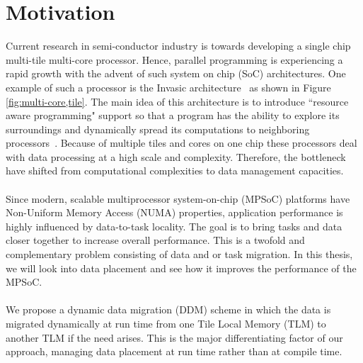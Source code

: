 \documentclass{listhesis}
\begin{document}
\section{Motivation}
Current research in semi-conductor industry is towards developing a single chip multi-tile multi-core processor. Hence, parallel programming is experiencing a rapid growth with the advent of such system on chip (SoC) architectures. One example of such a processor is the Invasic architecture~\cite{invasive} as shown in Figure \ref{fig:multi-core,tile}. The main idea of this architecture is to introduce ``resource aware programming" support so that a program has the ability to explore its surroundings and dynamically spread its computations to neighboring processors~\cite{invasive}. Because of multiple tiles and cores on one chip these processors deal with data processing at a high scale and complexity. Therefore, the bottleneck have shifted from computational complexities to data management capacities.\\
\\
Since modern, scalable multiprocessor system-on-chip (MPSoC) platforms have Non-Uniform Memory Access (NUMA) properties, application performance is highly influenced by data-to-task locality. The goal is to bring tasks and data closer together to increase overall performance. This is a twofold and complementary problem consisting of data and or task migration. In this thesis, we will look into data placement and see how it improves the performance of the MPSoC.\\
\\
We propose a dynamic data migration (DDM) scheme in which the data is migrated dynamically at run time from one Tile Local Memory (TLM) to another TLM if the need arises. This is the major differentiating factor of our approach, managing data placement at run time rather than at compile time.
\end{document}
